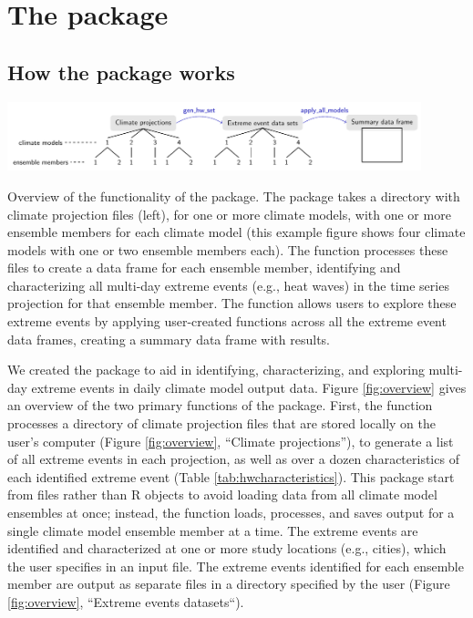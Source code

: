 \section{\texorpdfstring{The 
package}{The  package}}\label{the-package}

\subsection{How the package works}\label{how-the-package-works}

\begin{widefigure}
\includegraphics[width = 0.9\textwidth]{OverviewFigure}
\caption{Overview of the functionality of the  package. The package takes a directory with climate projection files (left), for one or more climate models, with one or more ensemble members for each climate model (this example figure shows four climate models with one or two ensemble members each). The  function processes these files to create a data frame for each ensemble member, identifying and characterizing all multi-day extreme events (e.g., heat waves) in the time series projection for that ensemble member. The  function allows users to explore these extreme events by applying user-created functions across all the extreme event data frames, creating a summary data frame with results.}
\label{fig:overview}
\end{widefigure}

We created the  package to aid in identifying,
characterizing, and exploring multi-day extreme events in daily climate
model output data. Figure \ref{fig:overview} gives an overview of the
two primary functions of the  package. First, the
 function processes a directory of climate projection
files that are stored locally on the user's computer (Figure
\ref{fig:overview}, ``Climate projections''), to generate a list of all
extreme events in each projection, as well as over a dozen
characteristics of each identified extreme event (Table
\ref{tab:hwcharacteristics}). This package start from files rather than
R objects to avoid loading data from all climate model ensembles at
once; instead, the function loads, processes, and saves output for a
single climate model ensemble member at a time. The extreme events are
identified and characterized at one or more study locations (e.g.,
cities), which the user specifies in an input file. The extreme events
identified for each ensemble member are output as separate files in a
directory specified by the user (Figure \ref{fig:overview}, ``Extreme
events datasets``).

